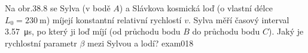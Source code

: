 \begin{fyzexam}{Na obr.38.8 se Sylva (v bodě \(A\)) a Slávkova kosmická loď (o vlastní délce \(L_0 =
  \qty{230}{\m}\)) míjejí konstantní relativní rychlostí \(v\). Sylva měří časový
  interval \qty{3.57}{\micro\s}, po který ji loď míjí (od průchodu bodu \(B\) do průchodu
  bodu \(C\)). Jaký je rychlostní parametr \(β\) mezi Sylvou a lodí?
  \hfill\cite[s.~1015]{Halliday2001}}{exam018} 

  {\centering
  \captionsetup{type=figure}
  \par} 

\end{fyzexam}